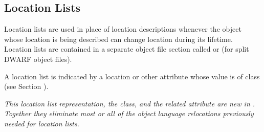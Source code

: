 \subsection{Location Lists}
\label{chap:locationlists}
Location lists are used in place of location descriptions whenever
the object whose location is being described can change location
during its lifetime. Location lists are contained in a separate
object file section called \dotdebugloclists{} or \dotdebugloclistsdwo{}
(for split DWARF object files).

A location list is indicated by a location or other attribute
whose value is of class \CLASSloclist{}
(see Section ).

\textit{This location list representation, the \CLASSloclist{} class, and the
related \DWATloclistsbase{} attribute are new in \DWARFVersionV.
Together they eliminate most or all of the object language relocations
previously needed for location lists.}


